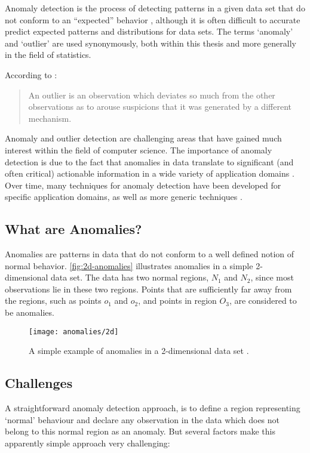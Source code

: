 Anomaly detection is the process of detecting patterns in a given data set that
do not conform to an ``expected'' behavior \cite{Chandola:2007}, although it is
often difficult to accurate predict expected patterns and distributions for data
sets. The terms `anomaly' and `outlier' are used synonymously, both within this
thesis and more generally in the field of statistics.

According to \citeauthor{Hawkins:1980} \cite{Hawkins:1980}:
\begin{quote}
An outlier is an observation which deviates so much from the other observations
as to arouse suspicions that it was generated by a different mechanism.
\end{quote}

Anomaly and outlier detection are challenging areas that have gained much
interest within the field of computer science. The importance of anomaly
detection is due to the fact that anomalies in data translate to significant
(and often critical) actionable information in a wide variety of application
domains \cite{Chandola:2007}. Over time, many techniques for anomaly detection
have been developed for specific application domains, as well as more generic
techniques \cite{Chandola:2007}.

\subsection{What are Anomalies?}
\label{anomalyDetection:whatAreAnomalies}
Anomalies are patterns in data that do not conform to a well defined notion of
normal behavior. \autoref{fig:2d-anomalies} illustrates anomalies in a simple
2-dimensional data set. The data has two normal regions, $N_{1}$ and $N_{2}$,
since most observations lie in these two regions. Points that are sufficiently
far away from the regions, such as points $o_{1}$ and $o_{2}$, and points in
region $O_{3}$, are considered to be anomalies.

\begin{figure}
    \centering
    \texttt{[image: anomalies/2d]}
    \caption[A simple example of anomalies in a 2-dimensional data set.]
        {A simple example of anomalies in a 2-dimensional data set
        \cite{Chandola:2007}.}
    \label{fig:2d-anomalies}
\end{figure}

\subsection{Challenges}
\label{anomalyDetection:Challenges}
A straightforward anomaly detection approach, is to define a region representing
`normal' behaviour and declare any observation in the data which does not belong
to this normal region as an anomaly. But several factors make this apparently
simple approach very challenging:

